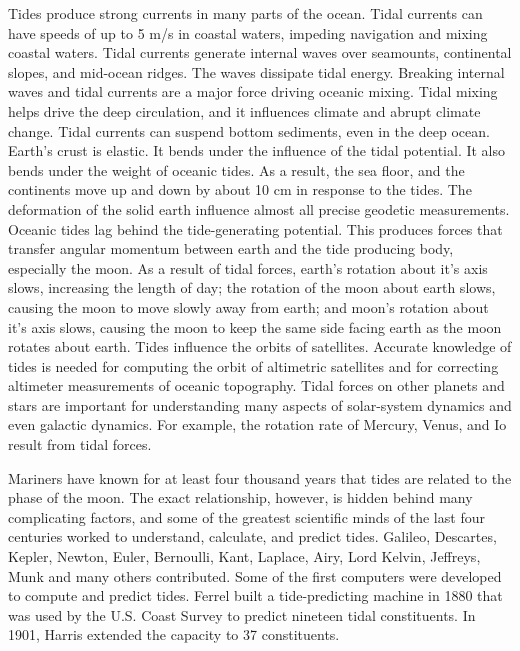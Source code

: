 \begin{enumerate}
\vitem
Tides produce strong currents in many parts of the ocean. Tidal currents can have speeds of up to 5 m/s in coastal waters, impeding navigation and mixing coastal waters.
\vitem
Tidal currents generate internal waves over seamounts, continental slopes, and mid-ocean ridges. The waves dissipate tidal energy. Breaking internal waves and tidal currents are a major force driving oceanic mixing.
\vitem
Tidal mixing helps drive the deep circulation, and it influences climate and abrupt climate change. 
\vitem
Tidal currents can suspend bottom sediments, even in the deep ocean.
\vitem
Earth's crust is elastic. It bends under the influence of the tidal potential. It also bends under the weight of oceanic tides. As a result, the sea floor, and the continents move up and down by about 10 cm in response to the tides. The deformation of the solid earth influence almost all precise geodetic measurements.
\vitem
Oceanic tides lag behind the tide-generating potential. This produces forces that transfer angular momentum between earth and the tide produc\-ing body, especially the moon. As a result of tidal forces, earth's rotation about it's axis slows, increasing the length of day; the rotation of the moon about earth slows, causing the moon to move slowly away from earth; and moon's rotation about it's axis slows, causing the moon to keep the same side facing earth as the moon rotates about earth.
\vitem
Tides influence the orbits of satellites. Accurate knowledge of tides is needed for computing the orbit of altimetric satellites and for correcting altimeter measurements of oceanic topography.
\vitem
Tidal forces on other planets and stars are important for understanding many aspects of solar-system dynamics and even galactic dynamics. For example, the rotation rate of Mercury, Venus, and Io result from tidal forces.
\end{enumerate}

Mariners have known for at least four thousand years that tides are related to the
phase of the moon. The exact relationship, however, is hidden behind many
complicating factors, and some of the greatest scientific minds of the last four
centuries worked to understand, calculate, and predict tides. Galileo, Descartes,
Kepler, Newton, Euler, Bernoulli, Kant, Laplace, Airy, Lord Kelvin, Jeffreys, Munk
and many others contributed. Some of the first computers were developed to
compute and predict tides. Ferrel built a tide-predicting machine in 1880 that
was used by the U.S. Coast Survey to predict nineteen tidal
constituents. In 1901, Harris extended the capacity to 37 constituents.

